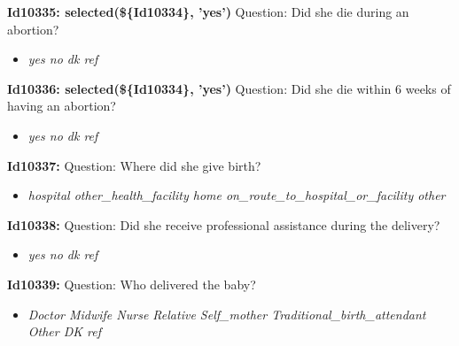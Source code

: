 \documentclass{article}%
\begin{document}
\textbf{Id10335: selected(\$\{Id10334\}, 'yes')\newline%
}%
Question: Did she die during an abortion?\newline%
%
\begin{itemize}%
\item%
\textit{yes\newline%
 no\newline%
 dk\newline%
 ref\newline%
}%
\end{itemize}%
\textbf{Id10336: selected(\$\{Id10334\}, 'yes')\newline%
}%
Question: Did she die within 6 weeks of having an abortion?\newline%
%
\begin{itemize}%
\item%
\textit{yes\newline%
 no\newline%
 dk\newline%
 ref\newline%
}%
\end{itemize}%
\textbf{Id10337: \newline%
}%
Question: Where did she give birth?\newline%
%
\begin{itemize}%
\item%
\textit{hospital\newline%
 other\_health\_facility\newline%
 home\newline%
 on\_route\_to\_hospital\_or\_facility\newline%
 other\newline%
}%
\end{itemize}%
\textbf{Id10338: \newline%
}%
Question: Did she receive professional assistance during the delivery?\newline%
%
\begin{itemize}%
\item%
\textit{yes\newline%
 no\newline%
 dk\newline%
 ref\newline%
}%
\end{itemize}%
\textbf{Id10339: \newline%
}%
Question: Who delivered the baby?\newline%
%
\begin{itemize}%
\item%
\textit{Doctor\newline%
 Midwife\newline%
 Nurse\newline%
 Relative\newline%
 Self\_mother\newline%
 Traditional\_birth\_attendant\newline%
 Other\newline%
 DK\newline%
 ref\newline%
}%
\end{itemize}%
\end{document}
